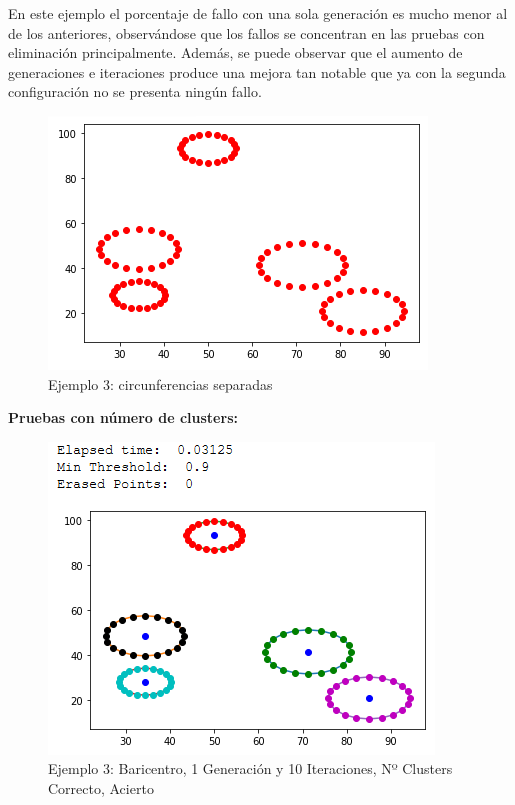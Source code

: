 \documentclass[conference,a4paper]{IEEEtran}
\begin{document}
En este ejemplo el porcentaje de fallo con una sola generación es mucho menor al de los anteriores, observándose que los fallos se concentran en las pruebas con eliminación principalmente. Además, se puede observar que el aumento de generaciones e iteraciones produce una mejora tan notable que ya con la segunda configuración no se presenta ningún fallo.

\begin{figure}[H]
\centering
\includegraphics[scale=0.65]{Experimentacion/Ejemplo3/Ejemplo3}
\caption{Ejemplo 3: circunferencias separadas}
\end{figure}


\textbf{Pruebas con número de clusters:}\\

\begin{figure}[H]
\centering
\includegraphics[scale=0.65]{Experimentacion/Ejemplo3/ej3_b_1_10_cc_correct}
\caption{Ejemplo 3: Baricentro, 1 Generación y 10 Iteraciones,  Nº Clusters Correcto, Acierto\\}
\end{figure}
\end{document}
